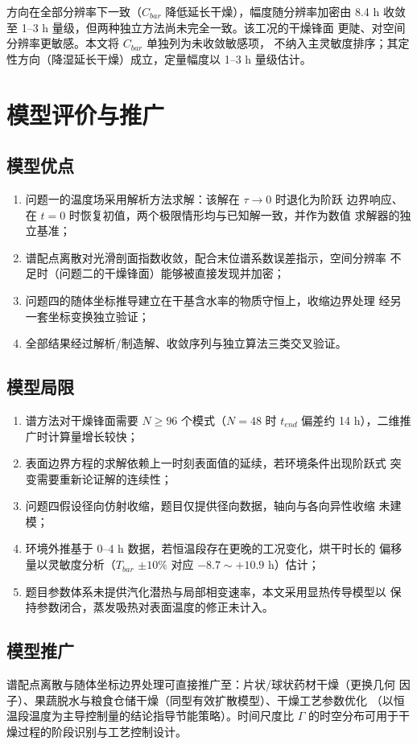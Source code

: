方向在全部分辨率下一致（$C_{bar}$ 降低延长干燥），幅度随分辨率加密由
8.4 h 收敛至 1--3 h 量级，但两种独立方法尚未完全一致。该工况的干燥锋面
更陡、对空间分辨率更敏感。本文将 $C_{bar}$ 单独列为未收敛敏感项，
不纳入主灵敏度排序；其定性方向（降湿延长干燥）成立，定量幅度以
1--3 h 量级估计。

\section{模型评价与推广}

\subsection{模型优点}

\begin{enumerate}
\item 问题一的温度场采用解析方法求解：该解在 $\tau\to0$ 时退化为阶跃
边界响应、在 $t=0$ 时恢复初值，两个极限情形均与已知解一致，并作为数值
求解器的独立基准；
\item 谱配点离散对光滑剖面指数收敛，配合末位谱系数误差指示，空间分辨率
不足时（问题二的干燥锋面）能够被直接发现并加密；
\item 问题四的随体坐标推导建立在干基含水率的物质守恒上，收缩边界处理
经另一套坐标变换独立验证；
\item 全部结果经过解析/制造解、收敛序列与独立算法三类交叉验证。
\end{enumerate}

\subsection{模型局限}

\begin{enumerate}
\item 谱方法对干燥锋面需要 $N\ge96$ 个模式（$N=48$ 时 $t_{end}$ 偏差约
14 h），二维推广时计算量增长较快；
\item 表面边界方程的求解依赖上一时刻表面值的延续，若环境条件出现阶跃式
突变需要重新论证解的连续性；
\item 问题四假设径向仿射收缩，题目仅提供径向数据，轴向与各向异性收缩
未建模；
\item 环境外推基于 0--4 h 数据，若恒温段存在更晚的工况变化，烘干时长的
偏移量以灵敏度分析（$T_{bar}$ $\pm10\%$ 对应 $-8.7\sim+10.9$ h）估计；
\item 题目参数体系未提供汽化潜热与局部相变速率，本文采用显热传导模型以
保持参数闭合，蒸发吸热对表面温度的修正未计入。
\end{enumerate}

\subsection{模型推广}

谱配点离散与随体坐标边界处理可直接推广至：片状/球状药材干燥（更换几何
因子）、果蔬脱水与粮食仓储干燥（同型有效扩散模型）、干燥工艺参数优化
（以恒温段温度为主导控制量的结论指导节能策略）。时间尺度比 $\Gamma$
的时空分布可用于干燥过程的阶段识别与工艺控制设计。
